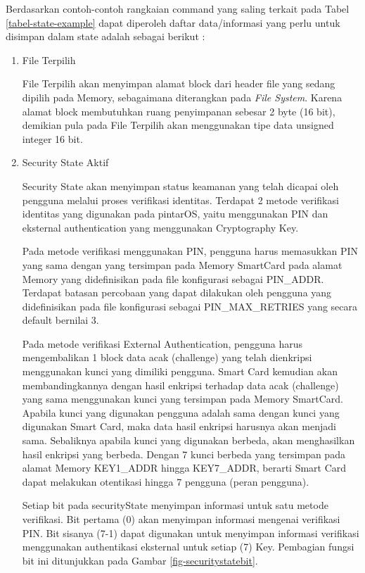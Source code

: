 Berdasarkan contoh-contoh rangkaian command yang saling terkait pada Tabel \ref{tabel-state-example} dapat diperoleh daftar data/informasi yang perlu untuk disimpan dalam state adalah sebagai berikut :

\begin{enumerate}
\item File Terpilih

File Terpilih akan menyimpan alamat block dari header file yang sedang dipilih pada Memory, sebagaimana diterangkan pada \emph{File System}. Karena alamat block membutuhkan ruang penyimpanan sebesar 2 byte (16 bit), demikian pula pada File Terpilih akan menggunakan tipe data unsigned integer 16 bit. 

\item Security State Aktif

Security State akan menyimpan status keamanan yang telah dicapai oleh pengguna melalui proses verifikasi identitas. Terdapat 2 metode verifikasi identitas yang digunakan pada pintarOS, yaitu menggunakan PIN dan eksternal authentication yang menggunakan Cryptography Key.

Pada metode verifikasi menggunakan PIN, pengguna harus memasukkan PIN yang sama dengan yang tersimpan pada Memory SmartCard pada alamat Memory yang didefinisikan pada file konfigurasi sebagai PIN\_ADDR. Terdapat batasan percobaan yang dapat dilakukan oleh pengguna yang didefinisikan pada file konfigurasi sebagai PIN\_MAX\_RETRIES yang secara default bernilai 3.

Pada metode verifikasi External Authentication, pengguna harus mengembalikan 1 block data acak (challenge) yang telah dienkripsi menggunakan kunci yang dimiliki pengguna. Smart Card kemudian akan membandingkannya dengan hasil enkripsi terhadap data acak (challenge) yang sama menggunakan kunci yang tersimpan pada Memory SmartCard. Apabila kunci yang digunakan pengguna adalah sama dengan kunci yang digunakan Smart Card, maka data hasil enkripsi harusnya akan menjadi sama. Sebaliknya apabila kunci yang digunakan berbeda, akan menghasilkan hasil enkripsi yang berbeda. Dengan 7 kunci berbeda yang tersimpan pada alamat Memory KEY1\_ADDR hingga KEY7\_ADDR, berarti Smart Card dapat melakukan otentikasi hingga 7 pengguna (peran pengguna).

Setiap bit pada securityState menyimpan informasi untuk satu metode verifikasi. Bit pertama (0) akan menyimpan informasi mengenai verifikasi PIN. Bit sisanya (7-1) dapat digunakan untuk menyimpan informasi verifikasi menggunakan authentikasi eksternal untuk setiap (7) Key. Pembagian fungsi bit ini ditunjukkan pada Gambar \ref{fig-securitystatebit}.


\end{enumerate}
